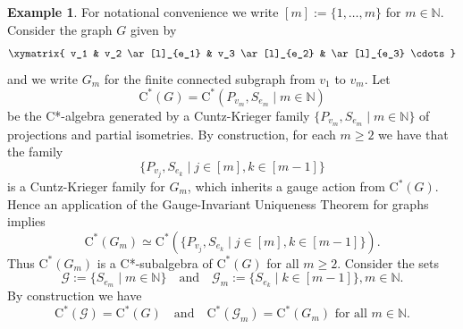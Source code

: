 \documentclass[11pt, draft]{amsart}
\numberwithin{equation}{section}
\theoremstyle{plain}
\theoremstyle{definition}
\newtheorem{example}[theorem]{Example}
\theoremstyle{remark}
\newcommand{\G}{{\mathcal{G}}}
\newcommand{\bN}{\mathbb{N}}
\newcommand{\foral}{\text{ for all }}
\newcommand{\qand}{\quad\text{and}\quad}
\newcommand{\ca}{\mathrm{C}^*}
\begin{document}
\begin{example} \label{E:notunit hyp not rig}
For notational convenience we write $[m]:=\{1, \dots, m\}$ for $m \in \bN$.
Consider the graph $G$ given by
\[
\xymatrix{ v_1 & v_2 \ar[l]_{e_1} & v_3 \ar[l]_{e_2} & \ar[l]_{e_3} \cdots}
\]
and we write $G_m$ for the finite connected subgraph from $v_1$ to $v_m$.
Let 
\[
\ca(G) = \ca(P_{v_m}, S_{e_m} \mid m \in \bN)
\]
be the C*-algebra generated by a Cuntz-Krieger family $\{P_{v_m}, S_{e_m} \mid m \in \bN\}$ of projections and partial isometries.
By construction, for each $m \geq 2$ we have that the family 
\[
\{P_{v_j}, S_{e_k} \mid j \in [m], k \in [m-1]\}
\]
is a Cuntz-Krieger family for $G_m$, which inherits a gauge action from $\ca(G)$.
Hence an application of the Gauge-Invariant Uniqueness Theorem for graphs \cite{HR97} implies
\[
\ca(G_m) \simeq \ca(\{P_{v_j}, S_{e_k} \mid j \in [m], k \in [m-1]\}).
\]
Thus $\ca(G_m)$ is a C*-subalgebra of $\ca(G)$ for all $m \geq 2$.
Consider the sets
\[
\G := \{S_{e_m} \mid m \in \bN\}
\qand
\G_m := \{S_{e_k} \mid  k \in [m-1]\}, m \in \bN.
\]
By construction we have
\[
\ca(\G) = \ca(G)
\qand
\ca(\G_m) = \ca(G_m) \foral m \in \bN.
\]


\end{example}
\end{document}
